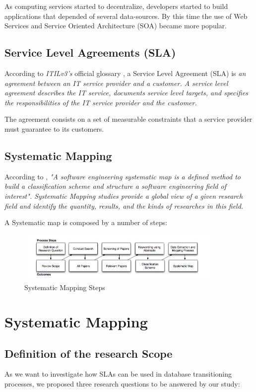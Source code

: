 \documentclass{article}
\begin{document}
As computing services started to decentralize, developers started to build applications that depended of several data-sources. By this time the use of Web Services and Service Oriented Architecture (SOA) became more popular. 



\subsection{Service Level Agreements (SLA)}
According to \textit{ITILv3's} official glossary \cite{itilv3glossary}, a Service Level Agreement (SLA) is \textit{an agreement between an IT service provider and a customer.  A service level agreement describes the IT service, documents service level targets, and specifies the responsibilities of the IT service provider and the customer.} 

The agreement consists on a set of measurable constraints that a service provider must guarantee to its customers.

\subsection{Systematic Mapping}
According to \cite{Petersen:2008:SMS:2227115.2227123}, \textit{"A software engineering systematic map is a defined method to build a classification scheme and structure a software engineering field of interest". Systematic Mapping studies provide a global view of a given research field and identify the quantity, results, and the kinds of researches in this field.}

A Systematic map is composed by a number of steps:
\begin{figure}[ht!]
\centering
\includegraphics[width=100mm]{pic1.png}
\caption{Systematic Mapping Steps \label{overflow}}
\end{figure}



\section{Systematic Mapping}

\subsection{Definition of the research Scope}
As we want to investigate how SLAs can be used in database transitioning processes, we proposed three research questions to be answered by our study: 
\end{document}
